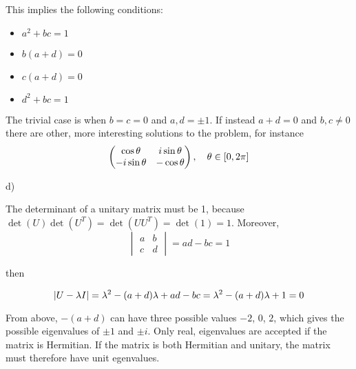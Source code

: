 \documentclass{article}
\begin{document}
This implies the following conditions:
\begin{itemize}
	\item $a^2+bc=1$ 
	\item $b(a+d)=0$
	\item $c(a+d)=0$
	\item $d^2+bc=1$
\end{itemize}

The trivial case is when $b=c=0$ and $a,d=\pm1$. If instead $a+d=0$ and $b,c\neq0$ there are other, more interesting solutions to the problem, for instance
\begin{equation*}
\begin{pmatrix}
\cos{\theta} & i\sine{\theta} \\
-i\sine{\theta} & -\cos{\theta}
\end{pmatrix},
\quad \theta \in [0,2\pi]
\end{equation*}

\vspace{1cm}

d)

\vspace{0.5cm}

The determinant of a unitary matrix must be 1, because $\det(U)\det(U^T)=\det(UU^T)=\det(1)=1$. Moreover,
\begin{equation*}
{\begin{vmatrix}
a & b \\ 
c & d
\end{vmatrix}}
= ad-bc = 1
\end{equation*}

then

\begin{equation*}
\abs{U-\lambda I} = \lambda^2-(a+d)\lambda+ad-bc = \lambda^2 -(a+d)\lambda+1=0
\end{equation*}

From above, $-(a+d)$ can have three possible values $-2$, $0$, $2$, which gives the possible eigenvalues of $\pm1$ and $\pm i$. Only real, eigenvalues are accepted if the matrix is Hermitian. If the matrix is both Hermitian and unitary, the matrix must therefore have unit egenvalues.
\end{document}
